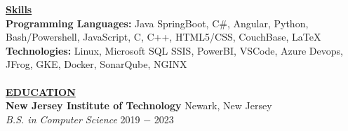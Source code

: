 \documentclass{article}
\begin{document}
\noindent \textbf{\underline{Skills}} \\
\noindent \textbf{Programming Languages: } Java SpringBoot, C\#, Angular, Python, Bash/Powershell, JavaScript, C, C++, HTML5/CSS, CouchBase, \LaTeX\\
\noindent \textbf{Technologies: } Linux, Microsoft SQL SSIS, PowerBI, VSCode, Azure Devops, JFrog, GKE, Docker, SonarQube, NGINX\\ \\
\noindent \textbf{\underline{EDUCATION}} \\
\textbf{New Jersey Institute of Technology} \hfill Newark, New Jersey \\
\textit{B.S. in Computer Science}  \hfill \hfill 2019 $-$ 2023 \\
\end{document}
